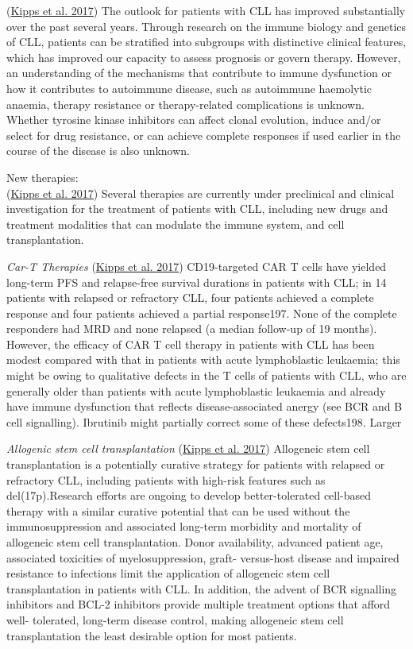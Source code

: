 \documentclass[11pt, a4paper, twosided]{book}
\begin{document}
(\protect\hyperlink{ref-Kipps2017}{Kipps et al. 2017})
The outlook for patients with CLL has improved substantially over the past several years. Through research on the immune biology and genetics of CLL, patients can be stratified into subgroups with distinctive clinical features, which has improved our capacity to assess prognosis or govern therapy. However, an understanding of the mechanisms that contribute to immune dysfunction or how it contributes to autoimmune disease, such as autoimmune haemolytic anaemia, therapy resistance or therapy-related complications is unknown. Whether tyrosine kinase inhibitors can affect clonal evolution, induce and/or select for drug resistance, or can achieve complete responses if used earlier in the course of the disease is also unknown.

New therapies:\\
(\protect\hyperlink{ref-Kipps2017}{Kipps et al. 2017})
Several therapies are currently under preclinical and clinical investigation for the treatment of patients with CLL, including new drugs and treatment modalities that can modulate the immune system, and cell transplantation.

\emph{Car-T Therapies}
(\protect\hyperlink{ref-Kipps2017}{Kipps et al. 2017})
CD19-targeted CAR T cells have yielded long-term PFS and relapse-free survival durations in patients with CLL; in 14 patients with relapsed or refractory CLL, four patients achieved a complete response and four patients achieved a partial response197. None of the complete responders had MRD and none relapsed (a median follow-up of 19 months). However, the efficacy of CAR T cell therapy in patients with CLL has been modest compared with that in patients with acute lymphoblastic leukaemia; this might be owing to qualitative defects in the T cells of patients with CLL, who are generally older than patients with acute lymphoblastic leukaemia and already have immune dysfunction that reflects disease-associated anergy (see BCR and B cell signalling). Ibrutinib might partially correct some of these defects198. Larger

\emph{Allogenic stem cell transplantation}
(\protect\hyperlink{ref-Kipps2017}{Kipps et al. 2017})
Allogeneic stem cell transplantation is a potentially curative strategy for patients with relapsed or refractory CLL, including patients with high-risk features such as del(17p).Research efforts are ongoing to develop better-tolerated cell-based therapy with a similar curative potential that can be used without the immunosuppression and associated long-term morbidity and mortality of allogeneic stem cell transplantation.
Donor availability, advanced patient age, associated toxicities of myelosuppression, graft- versus-host disease and impaired resistance to infections limit the application of allogeneic stem cell transplantation in patients with CLL. In addition, the advent of BCR signalling inhibitors and BCL-2 inhibitors provide multiple treatment options that afford well- tolerated, long-term disease control, making allogeneic stem cell transplantation the least desirable option for most patients.
\end{document}
